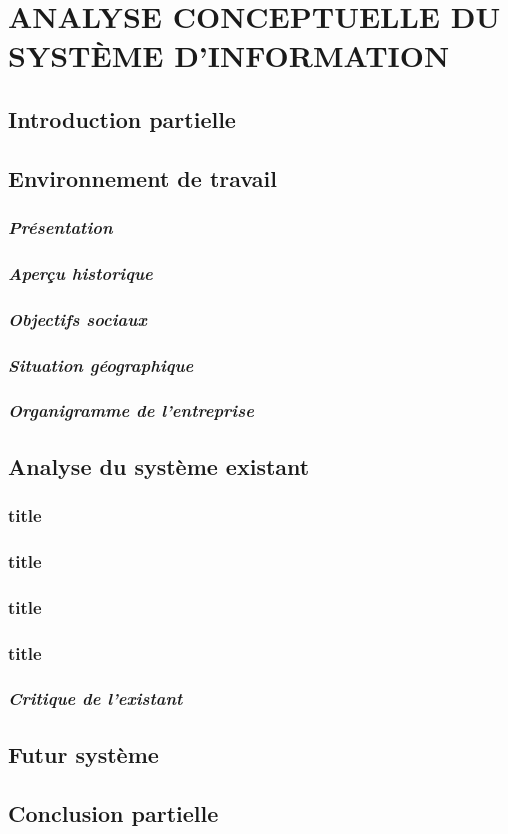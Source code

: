 \chapter[ANALYSE CONCEPTUELLE DU SYSTÈME D’INFORMATION]{ANALYSE CONCEPTUELLE DU SYSTÈME D’INFORMATION}
    \section[Introduction partielle]{Introduction partielle}
    \section[Environnement de travail]{Environnement de travail}
        \subsection[Présentation]{\textit{Présentation}}
        \subsection[Aperçu historique]{\textit{Aperçu historique}}
        \subsection[Objectifs sociaux]{\textit{Objectifs sociaux}}
        \subsection[Situation géographique]{\textit{Situation géographique}}
        \subsection[Organigramme de l’entreprise]{\textit{Organigramme de l’entreprise}}
    \section[Analyse du système existant]{Analyse du système existant}
        \subsection[short]{title}
        \subsection[short]{title}
        \subsection[short]{title}
        \subsection[short]{title}
        \subsection[Critique de l’existant]{\textit{Critique de l’existant}}
    \section[Futur système]{Futur système}
    \section[Conclusion partielle]{Conclusion partielle}